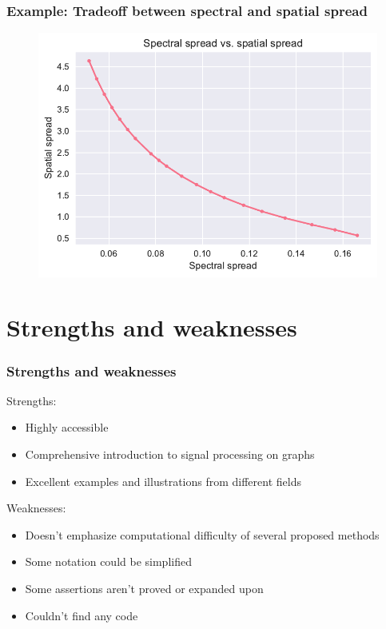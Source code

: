 \documentclass{beamer}
\begin{document}
\begin{frame}
  \frametitle{Example: Tradeoff between spectral and spatial spread}
\begin{figure}
\includegraphics[width=0.9\linewidth]{../img/wavelet_filter_7.pdf}
\end{figure}
\end{frame}
 
\section{Strengths and weaknesses}

\begin{frame}
  \frametitle{Strengths and weaknesses}
  Strengths:

  \begin{itemize}
  \item Highly accessible
  \item Comprehensive introduction to signal processing on graphs
  \item Excellent examples and illustrations from different fields
  \end{itemize}

  Weaknesses:

  \begin{itemize}
  \item Doesn't emphasize computational difficulty of several proposed methods
  \item Some notation could be simplified
  \item Some assertions aren't proved or expanded upon
  \item Couldn't find any code
  \end{itemize}
\end{frame}
\end{document}
